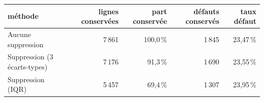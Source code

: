 \begin{tabular}{lrrrr}
\toprule
\textbf{méthode} & \textbf{lignes conservées} & \textbf{part conservée} & \textbf{défauts conservés} & \textbf{taux défaut} \\
\midrule
Aucune suppression & 7\,861 & 100,0\,\% & 1\,845 & 23,47\,\% \\
Suppression (3 écarts-types) & 7\,176 & 91,3\,\% & 1\,690 & 23,55\,\% \\
Suppression (IQR) & 5\,457 & 69,4\,\% & 1\,307 & 23,95\,\% \\
\bottomrule
\end{tabular}
